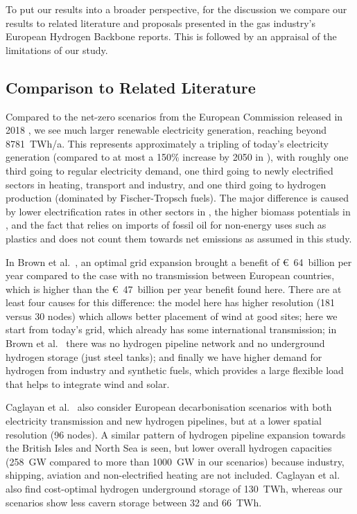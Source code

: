 To put our results into a broader perspective, for the discussion we compare our
results to related literature and proposals presented in the gas industry's
European Hydrogen Backbone reports. This is followed by an appraisal of the
limitations of our study.

\subsection*{Comparison to Related Literature}


Compared to the net-zero scenarios from the European Commission released in 2018
\cite{in-depth_2018}, we see much larger renewable electricity generation,
reaching beyond 8781~TWh/a. This represents approximately a tripling of today's
electricity generation (compared to at most a 150\% increase by 2050 in
\cite{in-depth_2018}), with roughly one third going to regular electricity
demand, one third going to newly electrified sectors in heating, transport and
industry, and one third going to hydrogen production (dominated by
Fischer-Tropsch fuels). The major difference is caused by lower electrification
rates in other sectors in \cite{in-depth_2018}, the higher biomass potentials in
\cite{in-depth_2018}, and the fact that \cite{in-depth_2018} relies on imports
of fossil oil for non-energy uses such as plastics and does not count them
towards net emissions as assumed in this study.


In Brown et al.~\cite{brownSynergiesSector2018}, an optimal grid expansion
brought a benefit of \euro~64~billion per year compared to the case with no
transmission between European countries, which is higher than the
\euro~47~billion per year benefit found here. There are at least four causes for
this difference: the model here has higher resolution (181 versus 30 nodes)
which allows better placement of wind at good sites; here we start from today's
grid, which already has some international transmission; in Brown et
al.~\cite{brownSynergiesSector2018} there was no hydrogen pipeline network and
no underground hydrogen storage (just steel tanks); and finally we have higher
demand for hydrogen from industry and synthetic fuels, which provides a large
flexible load that helps to integrate wind and solar.


Caglayan et al.~\cite{Caglayan2019} also consider European decarbonisation
scenarios with both electricity transmission and new hydrogen pipelines, but at
a lower spatial resolution (96 nodes). A similar pattern of hydrogen pipeline
expansion towards the British Isles and North Sea is seen, but lower overall
hydrogen capacities (258~GW compared to more than 1000~GW in our scenarios)
because industry, shipping, aviation and non-electrified heating are not
included. Caglayan et al.~\cite{Caglayan2019} also find cost-optimal hydrogen
underground storage of 130~TWh, whereas our scenarios show less cavern storage
between 32 and 66~TWh.


